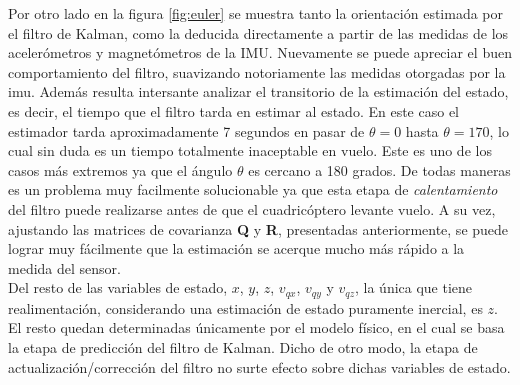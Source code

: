 \documentclass[main]{subfiles}
\begin{document}
Por otro lado en la figura \ref{fig:euler} se muestra tanto la orientación estimada por el filtro de Kalman, como la deducida directamente a partir de las medidas de los acelerómetros y magnetómetros de la IMU. Nuevamente se puede apreciar el buen comportamiento del filtro, suavizando notoriamente las medidas otorgadas por la imu. Además resulta intersante analizar el transitorio de la estimación del estado, es decir, el tiempo que el filtro tarda en estimar al estado. En este caso el estimador tarda aproximadamente 7 segundos en pasar de $\theta = 0$ hasta $\theta = 170$, lo cual sin duda es un tiempo totalmente inaceptable en vuelo. Este es uno de los casos más extremos ya que el ángulo $\theta$ es cercano a 180 grados. De todas maneras es un problema muy facilmente solucionable ya que esta etapa de \emph{calentamiento} del filtro puede realizarse antes de que el cuadricóptero levante vuelo. A su vez, ajustando las matrices de covarianza \textbf{Q} y \textbf{R}, presentadas anteriormente, se puede lograr muy fácilmente que la estimación se acerque mucho más rápido a la medida del sensor.\\

Del resto de las variables de estado, $x$, $y$, $z$, $v_{qx}$, $v_{qy}$ y $v_{qz}$, la única que tiene realimentación, considerando una estimación de estado puramente inercial, es $z$. El resto quedan determinadas únicamente por el modelo físico, en el cual se basa la etapa de predicción del filtro de Kalman. Dicho de otro modo, la etapa de actualización/corrección del filtro no surte efecto sobre dichas variables de estado.\\

\begin{figure} [h!]
\centering
   \hspace{10pt}
  \caption{}
  \label{fig:posyvel}
\end{figure}
\end{document}
